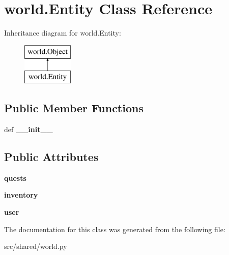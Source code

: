 \hypertarget{classworld_1_1_entity}{\section{world.\-Entity \-Class \-Reference}
\label{classworld_1_1_entity}
}
\-Inheritance diagram for world.\-Entity\-:\begin{figure}[H]
\begin{center}
\leavevmode
\includegraphics[height=2.000000cm]{classworld_1_1_entity}
\end{center}
\end{figure}
\subsection*{\-Public \-Member \-Functions}
\begin{DoxyCompactItemize}
\item 
\hypertarget{classworld_1_1_entity_ae3f6c9349b4756df29e482ae07582ca4}{def {\bfseries \-\_\-\-\_\-init\-\_\-\-\_\-}}\label{classworld_1_1_entity_ae3f6c9349b4756df29e482ae07582ca4}

\end{DoxyCompactItemize}
\subsection*{\-Public \-Attributes}
\begin{DoxyCompactItemize}
\item 
\hypertarget{classworld_1_1_entity_a02ac854a6a124cc8bfdef46ae7941434}{{\bfseries quests}}\label{classworld_1_1_entity_a02ac854a6a124cc8bfdef46ae7941434}

\item 
\hypertarget{classworld_1_1_entity_add2bc9bb2f731cc86228d8932a962e60}{{\bfseries inventory}}\label{classworld_1_1_entity_add2bc9bb2f731cc86228d8932a962e60}

\item 
\hypertarget{classworld_1_1_entity_a2e893d9acd136fa158874582882a3f13}{{\bfseries user}}\label{classworld_1_1_entity_a2e893d9acd136fa158874582882a3f13}

\end{DoxyCompactItemize}


\-The documentation for this class was generated from the following file\-:\begin{DoxyCompactItemize}
\item 
src/shared/world.\-py\end{DoxyCompactItemize}
